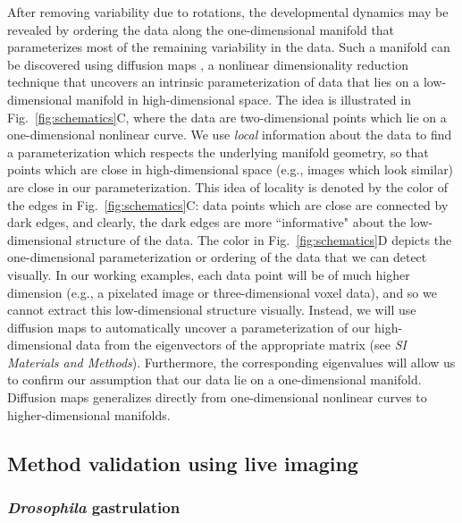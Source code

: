 \documentclass[twocolumn, 10pt]{article}
\newcommand{\SI}[0]{\textit{SI Materials and Methods}}
\newcommand{\fig}[0]{Fig.}
\begin{document}
After removing variability due to rotations, the developmental dynamics may be revealed by ordering the data along the one-dimensional manifold that parameterizes most of the remaining variability in the data.
%
Such a manifold can be discovered using diffusion maps \citep{coifman2005geometric}, a nonlinear dimensionality reduction technique that uncovers an intrinsic parameterization of data that lies on a low-dimensional manifold in high-dimensional space.
%
The idea is illustrated in \fig~\ref{fig:schematics}C, where the data are two-dimensional points which lie on a one-dimensional nonlinear curve.
%
We use {\it local} information about the data to find a parameterization which respects the underlying manifold geometry, so that points which are close in high-dimensional space (e.g., images which look similar) are close in our parameterization.
%
This idea of locality is denoted by the color of the edges in \fig~\ref{fig:schematics}C:
data points which are close are connected by dark edges, and clearly, the dark edges are more ``informative" about the low-dimensional structure of the data.
%
The color in \fig~\ref{fig:schematics}D depicts the one-dimensional parameterization or ordering of the data that we can detect visually.
%
In our working examples, each data point will be of much higher dimension (e.g., a pixelated image or three-dimensional voxel data), and so we cannot extract this low-dimensional structure visually.
%
Instead, we will use diffusion maps to automatically uncover a parameterization of our high-dimensional data from the eigenvectors of the appropriate matrix (see \SI).
%
Furthermore, the corresponding eigenvalues will allow us to confirm our assumption that our data lie on a one-dimensional manifold. 
%
Diffusion maps generalizes directly from one-dimensional nonlinear curves to higher-dimensional manifolds.


\subsection*{Method validation using live imaging}

\subsubsection*{{\em Drosophila} gastrulation}
\end{document}
